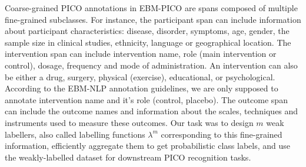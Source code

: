 \documentclass[10.7pt,]{article}
\begin{document}
Coarse-grained PICO annotations in EBM-PICO are spans composed of multiple fine-grained subclasses.
For instance, the participant span can include information about participant characteristics: disease, disorder, symptoms, age, gender, the sample size in clinical studies, ethnicity, language or geographical location.
The intervention span can include intervention name, role (main intervention or control), dosage, frequency and mode of administration.
An intervention can also be either a drug, surgery, physical (exercise), educational, or psychological.
According to the EBM-NLP annotation guidelines, we are only supposed to annotate intervention name and it's role (control, placebo).
The outcome span can include the outcome names and information about the scales, techniques and instruments used to measure these outcomes.
Our task was to design $m$ weak labellers, also called labelling functions $\lambda^{m}$ corresponding to this fine-grained information, efficiently aggregate them to get probabilistic class labels, and use the weakly-labelled dataset for downstream PICO recognition tasks.
%
%
%
\end{document}
